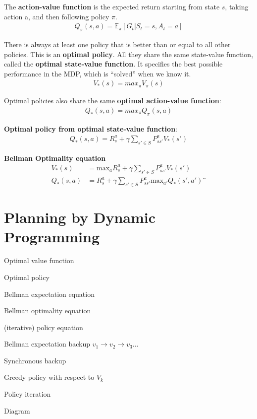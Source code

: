 \documentclass[journal]{IEEEtran}
\begin{document}
The \textbf{action-value function} is the expected return starting from state $s$, taking action a, and then following policy $\pi$.
\begin{align*}
Q_\pi(s,a) = \mathbb{E}_\pi [G_t |S_t=s,A_t=a]
\end{align*}

There is always at least one policy that is better than or equal to all other
policies. This is an \textbf{optimal policy}. All they share the same state-value function, called the \textbf{optimal state-value function}. It specifies the best possible performance in the MDP, which is “solved” when we know it.
\begin{align*}
V_*(s) = max_\pi V_\pi(s)
\end{align*}

Optimal policies also share the same \textbf{optimal action-value function}:
\begin{align*}
Q_*(s,a) = max_\pi Q_\pi(s,a)
\end{align*}

\textbf{Optimal policy from optimal state-value function}: 
\begin{align*}
Q_*(s,a) = R_s^a + \gamma\sum_{s'\in S} P_{ss'}^a V_*(s')
\end{align*}

\textbf{Bellman Optimality equation} 
\begin{align*}
V_*(s) &= \mbox{max}_a R_s^a + \gamma\sum_{s'\in S}P_{ss'}^a V_*(s') \\
Q_*(s,a) &= R_s^a + \gamma\sum_{s'\in S}P_{ss'}^a \mbox{max}_{a'}Q_*(s',a')¨
\end{align*}

\section{Planning by Dynamic Programming}

Optimal value function

Optimal policy

Bellman expectation equation

Bellman optimality equation

(iterative) policy equation

Bellman expectation backup $v_1 \rightarrow v_2 \rightarrow v_3 ...$

Synchronous backup

Greedy policy with respect to $V_k$

Policy iteration

Diagram
\end{document}
